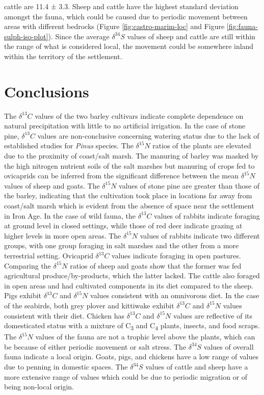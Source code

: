 \documentclass[preprint, 3p, authoryear]{elsarticle} %
\begin{document}
cattle are 11.4 ± 3.3\text{\textperthousand}. Sheep and cattle have the highest standard deviation amongst the fauna, which could be caused due to periodic movement between areas with different bedrocks (Figure \ref{fig:castro-marim-loc} and Figure \ref{fig:fauna-sulph-iso-plot}). Since the average \(\delta ^{34}S\) values of sheep and cattle are still within the range of what is considered local, the movement could be somewhere inland within the territory of the settlement.

\hypertarget{conclusions}{%
\section{Conclusions}\label{conclusions}}

The \(\delta ^{13}C\) values of the two barley cultivars indicate complete dependence on natural precipitation with little to no artificial irrigation. In the case of stone pine, \(\delta ^{13}C\) values are non-conclusive concerning watering status due to the lack of established studies for \emph{Pinus} species. The \(\delta ^{15}N\) ratios of the plants are elevated due to the proximity of coast/salt marsh. The manuring of barley was masked by the high nitrogen nutrient soils of the salt marshes but manuring of crops fed to ovicaprids can be inferred from the significant difference between the mean \(\delta ^{15}N\) values of sheep and goats. The \(\delta ^{15}N\) values of stone pine are greater than those of the barley, indicating that the cultivation took place in locations far away from coast/salt marsh which is evident from the absence of space near the settlement in Iron Age. In the case of wild fauna, the \(\delta ^{13}C\) values of rabbits indicate foraging at ground level in closed settings, while those of red deer indicate grazing at higher levels in more open areas. The \(\delta ^{15}N\) values of rabbits indicate two different groups, with one group foraging in salt marshes and the other from a more terrestrial setting. Ovicaprid \(\delta ^{13}C\) values indicate foraging in open pastures. Comparing the \(\delta ^{15}N\) ratios of sheep and goats show that the former was fed agricultural produce/by-products, which the latter lacked. The cattle also foraged in open areas and had cultivated components in its diet compared to the sheep. Pigs exhibit \(\delta ^{13}C\) and \(\delta ^{15}N\) values consistent with an omnivorous diet. In the case of the seabirds, both grey plover and kittiwake exhibit \(\delta ^{13}C\) and \(\delta ^{15}N\) values consistent with their diet. Chicken has \(\delta ^{13}C\) and \(\delta ^{15}N\) values are reflective of its domesticated status with a mixture of C\textsubscript{3} and C\textsubscript{4} plants, insects, and food scraps. The \(\delta ^{15}N\) values of the fauna are not a trophic level above the plants, which can be because of either periodic movement or salt stress. The \(\delta ^{34}S\) values of overall fauna indicate a local origin. Goats, pigs, and chickens have a low range of values due to penning in domestic spaces. The \(\delta ^{34}S\) values of cattle and sheep have a more extensive range of values which could be due to periodic migration or of being non-local origin.
\end{document}

